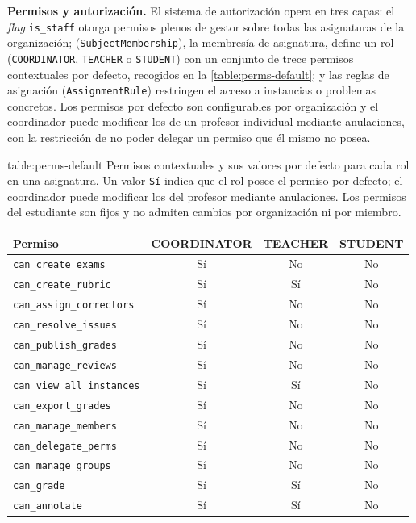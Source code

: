 \begin{functional}
  \item \textbf{Permisos y autorización.}
  \label{rf:perms}
  El sistema de autorización opera en tres capas: el \textit{flag}
  \texttt{is\_staff} otorga permisos plenos de gestor sobre todas las
  asignaturas de la organización; (\texttt{SubjectMembership}),
  la membresía de asignatura, define un rol (\texttt{COORDINATOR},
  \texttt{TEACHER} o \texttt{STUDENT}) con un conjunto de trece permisos
  contextuales por defecto, recogidos en la
  \cref{table:perms-default}; y las reglas de asignación
  (\texttt{AssignmentRule}) restringen el acceso a instancias o
  problemas concretos. Los permisos por defecto son configurables por
  organización y el coordinador puede modificar los de un profesor
  individual mediante anulaciones, con la restricción de no poder
  delegar un permiso que él mismo no posea.

  \begin{table}[Permisos por defecto por rol]{table:perms-default}{%
      Permisos contextuales y sus valores por defecto para cada rol en una
      asignatura. Un valor \texttt{Sí} indica que el rol posee el permiso
      por defecto; el coordinador puede modificar los del profesor mediante
      anulaciones. Los permisos del estudiante son fijos y no admiten
      cambios por organización ni por miembro.}
    \small
    \renewcommand{\arraystretch}{1.2}
    \begin{tabular}{l c c c}
      \hline
      \textbf{Permiso} & \textbf{COORDINATOR} & \textbf{TEACHER} & \textbf{STUDENT} \\
      \hline
      \texttt{can\_create\_exams}       & Sí & No  & No \\
      \texttt{can\_create\_rubric}      & Sí & Sí  & No \\
      \texttt{can\_assign\_correctors}  & Sí & No  & No \\
      \texttt{can\_resolve\_issues}     & Sí & No  & No \\
      \texttt{can\_publish\_grades}     & Sí & No  & No \\
      \texttt{can\_manage\_reviews}     & Sí & No  & No \\
      \texttt{can\_view\_all\_instances}& Sí & Sí  & No \\
      \texttt{can\_export\_grades}      & Sí & No  & No \\
      \texttt{can\_manage\_members}     & Sí & No  & No \\
      \texttt{can\_delegate\_perms}     & Sí & No  & No \\
      \texttt{can\_manage\_groups}      & Sí & No  & No \\
      \texttt{can\_grade}               & Sí & Sí  & No \\
      \texttt{can\_annotate}            & Sí & Sí  & No \\
      \hline
    \end{tabular}
  \end{table}


\end{functional}
